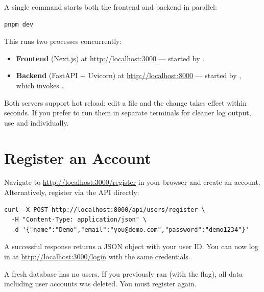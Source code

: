 A single command starts both the frontend and backend in parallel:

\begin{lstlisting}[style=bash, numbers=none]
pnpm dev
\end{lstlisting}

This runs two processes concurrently:

\begin{itemize}
    \item \textbf{Frontend} (Next.js) at \url{http://localhost:3000} --- started
          by .
    \item \textbf{Backend} (FastAPI + Uvicorn) at \url{http://localhost:8000}
          --- started by , which invokes
          .
\end{itemize}

Both servers support hot reload: edit a file and the change takes effect within
seconds.  If you prefer to run them in separate terminals for cleaner log
output, use  and  individually.


\section{Register an Account}
\label{sec:register-account}

Navigate to \url{http://localhost:3000/register} in your browser and create an
account.  Alternatively, register via the API directly:

\begin{lstlisting}[style=bash, numbers=none]
curl -X POST http://localhost:8000/api/users/register \
  -H "Content-Type: application/json" \
  -d '{"name":"Demo","email":"you@demo.com","password":"demo1234"}'
\end{lstlisting}

A successful response returns a JSON object with your user ID.  You can now log
in at \url{http://localhost:3000/login} with the same credentials.

\begin{warning}
A fresh database has no users.  If you previously ran \ic{docker-compose down
-v} (with the  flag), all data including user accounts was deleted.  You
must register again.
\end{warning}


